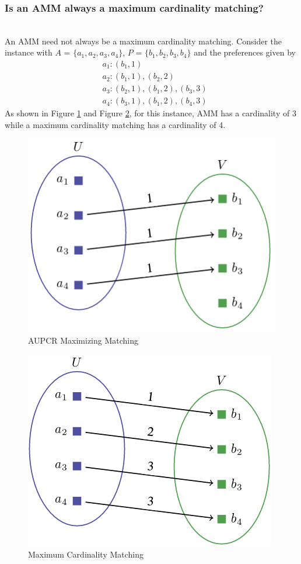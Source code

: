 \documentclass[letterpaper]{article} %
\begin{document}
\subsubsection{Is an AMM always a maximum cardinality matching?} ~ \\
An AMM need not always be a maximum cardinality matching. Consider the instance with $A$  = $\{a_1, a_2, a_3, a_4\}$, $P$  = $\{b_1, b_2, b_3, b_4\}$ and the preferences given by
\begin{align*}
&a_1 : (b_1, 1) \\
&a_2 : (b_1,1), (b_2,2) \\
&a_3 : (b_2,1), (b_1,2), (b_3,3) \\
&a_4 : (b_3,1), (b_1,2), (b_4,3)
\end{align*}
As shown in Figure \ref{AMM_1} and Figure \ref{MM_1}, for this instance, AMM has a cardinality of 3 while a maximum cardinality matching has a cardinality of 4.
\begin{figure}[h]
\centering
\includegraphics[scale=0.35]{AMM_1.png}
\caption{AUPCR Maximizing Matching}
\label{AMM_1}
\end{figure}
\begin{figure}[h]
\centering
\includegraphics[scale=0.35]{MM_1.png}
\caption{Maximum Cardinality Matching}
\label{MM_1}
\end{figure}
\end{document}
